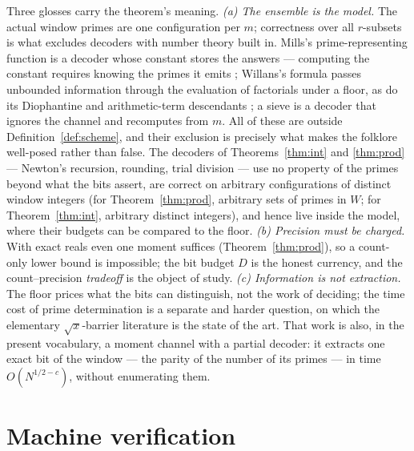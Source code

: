 \documentclass[11pt]{article}
\theoremstyle{remark}
\begin{document}
Three glosses carry the theorem's meaning. \emph{(a) The ensemble is the model.} The actual window
primes are one configuration per $m$; correctness over all $r$-subsets is what excludes decoders with
number theory built in. Mills's prime-representing function \cite{Mills} is a decoder whose constant
stores the answers --- computing the constant requires knowing the primes it emits
\cite{CaldwellCheng}; Willans's formula \cite{Willans} passes unbounded information through the
evaluation of factorials under a floor, as do its Diophantine and arithmetic-term descendants
\cite{JSWW,PrunescuShunia}; a sieve is a decoder that ignores the channel and recomputes
from $m$. All of these are outside Definition~\ref{def:scheme}, and their exclusion is precisely what
makes the folklore well-posed rather than false. The decoders of Theorems~\ref{thm:int} and
\ref{thm:prod} --- Newton's recursion, rounding, trial division --- use no property of the primes
beyond what the bits assert, are correct on arbitrary configurations of distinct window integers (for
Theorem~\ref{thm:prod}, arbitrary sets of primes in $W$; for Theorem~\ref{thm:int}, arbitrary distinct
integers), and hence live inside the model, where their budgets can be compared to the floor.
\emph{(b) Precision must be charged.} With exact reals even one moment suffices
(Theorem~\ref{thm:prod}), so a count-only lower bound is impossible; the bit budget $D$ is the honest
currency, and the count--precision \emph{tradeoff} is the object of study. \emph{(c) Information is
not extraction.} The floor prices what the bits can distinguish, not the work of deciding; the time
cost of prime determination is a separate and harder question, on which the elementary
$\sqrt{x}$-barrier literature \cite{Polymath} is the state of the art. That work is also, in the
present vocabulary, a moment channel with a partial decoder: it extracts one exact bit of the window
--- the parity of the number of its primes --- in time $O(N^{1/2 - c})$, without enumerating them.

\section{Machine verification}
\end{document}
